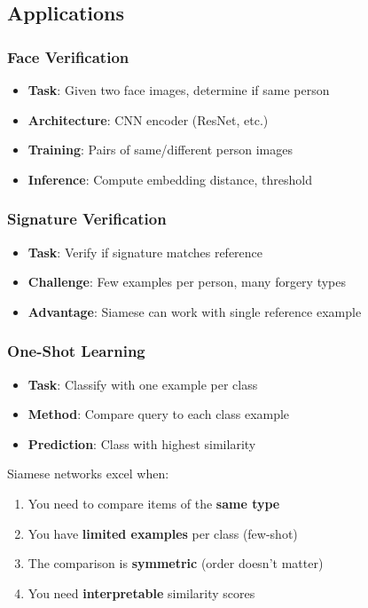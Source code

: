 \subsection{Applications}

\subsubsection{Face Verification}

\begin{itemize}
    \item \textbf{Task}: Given two face images, determine if same person
    \item \textbf{Architecture}: CNN encoder (ResNet, etc.)
    \item \textbf{Training}: Pairs of same/different person images
    \item \textbf{Inference}: Compute embedding distance, threshold
\end{itemize}

\subsubsection{Signature Verification}

\begin{itemize}
    \item \textbf{Task}: Verify if signature matches reference
    \item \textbf{Challenge}: Few examples per person, many forgery types
    \item \textbf{Advantage}: Siamese can work with single reference example
\end{itemize}

\subsubsection{One-Shot Learning}

\begin{itemize}
    \item \textbf{Task}: Classify with one example per class
    \item \textbf{Method}: Compare query to each class example
    \item \textbf{Prediction}: Class with highest similarity
\end{itemize}

\begin{keyinsight}
Siamese networks excel when:
\begin{enumerate}
    \item You need to compare items of the \textbf{same type}
    \item You have \textbf{limited examples} per class (few-shot)
    \item The comparison is \textbf{symmetric} (order doesn't matter)
    \item You need \textbf{interpretable} similarity scores
\end{enumerate}
\end{keyinsight}

